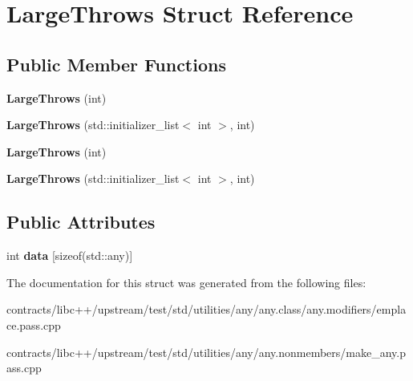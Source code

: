 \hypertarget{struct_large_throws}{}\section{Large\+Throws Struct Reference}
\label{struct_large_throws}
\subsection*{Public Member Functions}
\begin{DoxyCompactItemize}
\item 
\mbox{\label{struct_large_throws_a7fab19ff6c79d8bb1000522c40da800b}} 
{\bfseries Large\+Throws} (int)
\item 
\mbox{\label{struct_large_throws_a99e5f3eb094ca66be2888bf250cf8b09}} 
{\bfseries Large\+Throws} (std\+::initializer\+\_\+list$<$ int $>$, int)
\item 
\mbox{\label{struct_large_throws_a7fab19ff6c79d8bb1000522c40da800b}} 
{\bfseries Large\+Throws} (int)
\item 
\mbox{\label{struct_large_throws_a99e5f3eb094ca66be2888bf250cf8b09}} 
{\bfseries Large\+Throws} (std\+::initializer\+\_\+list$<$ int $>$, int)
\end{DoxyCompactItemize}
\subsection*{Public Attributes}
\begin{DoxyCompactItemize}
\item 
\mbox{\label{struct_large_throws_adcf63379d108da892560862423d10b45}} 
int {\bfseries data} \mbox{[}sizeof(std\+::any)\mbox{]}
\end{DoxyCompactItemize}


The documentation for this struct was generated from the following files\+:\begin{DoxyCompactItemize}
\item 
contracts/libc++/upstream/test/std/utilities/any/any.\+class/any.\+modifiers/emplace.\+pass.\+cpp\item 
contracts/libc++/upstream/test/std/utilities/any/any.\+nonmembers/make\+\_\+any.\+pass.\+cpp\end{DoxyCompactItemize}
